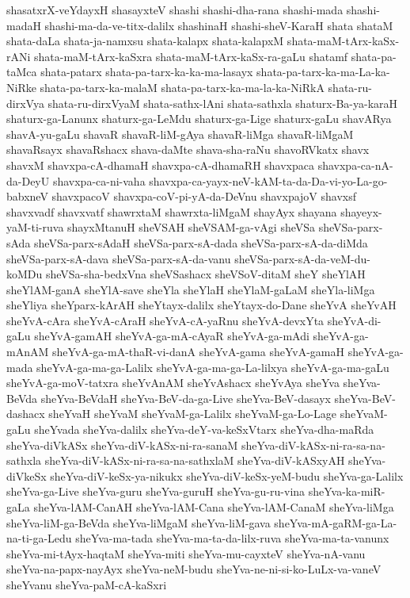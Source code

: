 {shasatxrX-veYdayxH
shasayxteV
shashi
shashi-dha-rana
shashi-mada
shashi-madaH
shashi-ma-da-ve-titx-dalilx
shashinaH
shashi-sheV-KaraH
shata
shataM
shata-daLa
shata-ja-namxsu
shata-kalapx
shata-kalapxM
shata-maM-tArx-kaSx-rANi
shata-maM-tArx-kaSxra
shata-maM-tArx-kaSx-ra-gaLu
shatamf
shata-pa-taMca
shata-patarx
shata-pa-tarx-ka-ka-ma-lasayx
shata-pa-tarx-ka-ma-La-ka-NiRke
shata-pa-tarx-ka-malaM
shata-pa-tarx-ka-ma-la-ka-NiRkA
shata-ru-dirxVya
shata-ru-dirxVyaM
shata-sathx-lAni
shata-sathxla
shaturx-Ba-ya-karaH
shaturx-ga-Lanunx
shaturx-ga-LeMdu
shaturx-ga-Lige
shaturx-gaLu
shavARya
shavA-yu-gaLu
shavaR
shavaR-liM-gAya
shavaR-liMga
shavaR-liMgaM
shavaRsayx
shavaRshacx
shava-daMte
shava-sha-raNu
shavoRVkatx
shavx
shavxM
shavxpa-cA-dhamaH
shavxpa-cA-dhamaRH
shavxpaca
shavxpa-ca-nA-da-DeyU
shavxpa-ca-ni-vaha
shavxpa-ca-yayx-neV-kAM-ta-da-Da-vi-yo-La-go-babxneV
shavxpacoV
shavxpa-coV-pi-yA-da-DeVnu
shavxpajoV
shavxsf
shavxvadf
shavxvatf
shawrxtaM
shawrxta-liMgaM
shayAyx
shayana
shayeyx-yaM-ti-ruva
shayxMtanuH
sheVSAH
sheVSAM-ga-vAgi
sheVSa
sheVSa-parx-sAda
sheVSa-parx-sAdaH
sheVSa-parx-sA-dada
sheVSa-parx-sA-da-diMda
sheVSa-parx-sA-dava
sheVSa-parx-sA-da-vanu
sheVSa-parx-sA-da-veM-du-koMDu
sheVSa-sha-bedxVna
sheVSashacx
sheVSoV-ditaM
sheY
sheYlAH
sheYlAM-ganA
sheYlA-save
sheYla
sheYlaH
sheYlaM-gaLaM
sheYla-liMga
sheYliya
sheYparx-kArAH
sheYtayx-dalilx
sheYtayx-do-Dane
sheYvA
sheYvAH
sheYvA-cAra
sheYvA-cAraH
sheYvA-cA-yaRnu
sheYvA-devxYta
sheYvA-di-gaLu
sheYvA-gamAH
sheYvA-ga-mA-cAyaR
sheYvA-ga-mAdi
sheYvA-ga-mAnAM
sheYvA-ga-mA-thaR-vi-danA
sheYvA-gama
sheYvA-gamaH
sheYvA-ga-mada
sheYvA-ga-ma-ga-Lalilx
sheYvA-ga-ma-ga-La-lilxya
sheYvA-ga-ma-gaLu
sheYvA-ga-moV-tatxra
sheYvAnAM
sheYvAshacx
sheYvAya
sheYva
sheYva-BeVda
sheYva-BeVdaH
sheYva-BeV-da-ga-Live
sheYva-BeV-dasayx
sheYva-BeV-dashacx
sheYvaH
sheYvaM
sheYvaM-ga-Lalilx
sheYvaM-ga-Lo-Lage
sheYvaM-gaLu
sheYvada
sheYva-dalilx
sheYva-deY-va-keSxVtarx
sheYva-dha-maRda
sheYva-diVkASx
sheYva-diV-kASx-ni-ra-sanaM
sheYva-diV-kASx-ni-ra-sa-na-sathxla
sheYva-diV-kASx-ni-ra-sa-na-sathxlaM
sheYva-diV-kASxyAH
sheYva-diVkeSx
sheYva-diV-keSx-ya-nikukx
sheYva-diV-keSx-yeM-budu
sheYva-ga-Lalilx
sheYva-ga-Live
sheYva-guru
sheYva-guruH
sheYva-gu-ru-vina
sheYva-ka-miR-gaLa
sheYva-lAM-CanAH
sheYva-lAM-Cana
sheYva-lAM-CanaM
sheYva-liMga
sheYva-liM-ga-BeVda
sheYva-liMgaM
sheYva-liM-gava
sheYva-mA-gaRM-ga-La-na-ti-ga-Ledu
sheYva-ma-tada
sheYva-ma-ta-da-lilx-ruva
sheYva-ma-ta-vanunx
sheYva-mi-tAyx-haqtaM
sheYva-miti
sheYva-mu-cayxteV
sheYva-nA-vanu
sheYva-na-papx-nayAyx
sheYva-neM-budu
sheYva-ne-ni-si-ko-LuLx-va-vaneV
sheYvanu
sheYva-paM-cA-kaSxri
}
